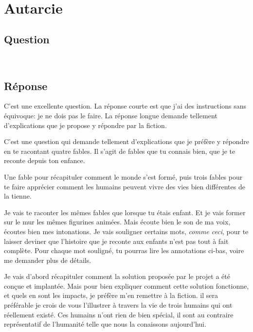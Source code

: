 \chapter{Autarcie}

\section*{Question}

\noindent\colorbox{gray!30}{}\\

\section*{Réponse}

C'est une excellente question. La réponse courte est que j'ai des instructions
sans équivoque: je ne dois pas le faire.
La réponse longue demande tellement d'explications que je propose y répondre par la fiction.


C'est une question qui demande tellement d'explications que je préfère y
répondre en te racontant quatre fables. Il s'agit de fables que tu connais bien,
que je te reconte depuis ton enfance. 

Une fable pour récapituler comment le monde s'est formé, puis trois fables pour
te faire apprécier comment les humains peuvent vivre des vies bien différentes
de la tienne.

Je vais te raconter les mêmes fables que lorsque tu étais enfant.  Et je vais
former sur le mur les mêmes figurines animées.  Mais écoute bien le son de ma
voix, écoutes bien mes intonations.  Je vais souligner certains mots,
\textit{comme ceci}, pour te laisser deviner que l'histoire que je reconte aux
enfants n'est pas tout à fait complète.  Pour chaque mot souligné, tu pourras
lire les annotations ci-bas, voire me demander plus de détails.

\colorbox{gray!30}{}

Je vais d'abord récapituler comment la solution proposée par le projet
\nomProjet{} a été conçue et implantée.  Mais pour bien expliquer comment cette
solution fonctionne, et quels en sont les impacts, je préfère m'en remettre à
la fiction.  il sera préférable je crois de vous l'illustrer à travers la vie
de trois humains qui ont réellement existé. Ces humains n'ont rien de bien
spécial, il sont au contraire représentatif de l'humanité telle que nous la
conaissons aujourd'hui.

